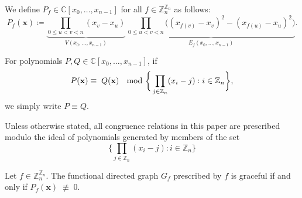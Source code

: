 \begin{defn}\label{defn:polynomial-grace-definition} We define $P_f \in \mathbb{C}[x_0, \ldots, x_{n-1}]$ for all $f \in \mathbb{Z}_n^{\mathbb{Z}_n}$ as follows:
\begin{equation}
    P_f(\mathbf{x}) \coloneq \underbrace{\prod_{0\le u<v<n}(x_{v}-x_{u})}_{V(x_0,\ldots,x_{n-1})}\,\underbrace{\prod_{0\le u<v<n}\big((x_{f(v)}-x_{v})^{2}-(x_{f(u)}-x_{u})^{2}\big)}_{E_f(x_0,\ldots,x_{n-1})}.
\end{equation}
\end{defn}
\begin{defn}\label{defn:polynomial-congruence}
For polynomials $P,Q \in \mathbb{C}[x_0, \ldots, x_{n-1}]$, if
\begin{equation}
P({\bf x}) \equiv \; Q({\bf x}) \; \mod\bigg\{\prod_{j\in\mathbb{Z}_{n}}(x_{i}-j):i\in\mathbb{Z}_{n}\bigg\},
\end{equation}
we simply write $P \equiv Q$.
\end{defn}
 Unless otherwise stated, all congruence relations in this paper are prescribed modulo the ideal of polynomials generated by members of the set
\[
\bigg\{\prod_{j\in\mathbb{Z}_{n}}(x_{i}-j):i\in\mathbb{Z}_{n}\bigg\}
\]
\begin{proposition}\label{prop:polynomial-grace-certificate}
Let $f\in\mathbb{Z}_{n}^{\mathbb{Z}_{n}}$. The functional
directed graph $G_f$ prescribed by $f$ is graceful if and only if $P_f(\mathbf{x}) \; \not\equiv \; 0$.
\end{proposition}
